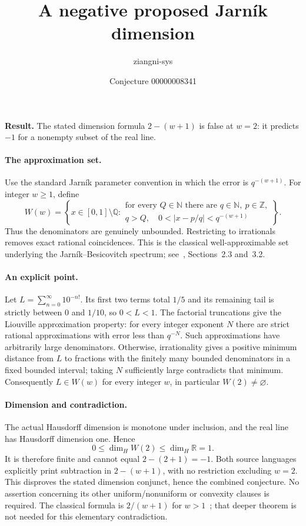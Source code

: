 \documentclass[11pt]{article}
\title{A negative proposed Jarn\'ik dimension}
\author{ziangni-sys}
\date{Conjecture 00000008341}
\begin{document}
\raggedright
\maketitle
\noindent\textbf{Result.} The stated dimension formula $2-(w+1)$ is false at $w=2$: it predicts $-1$ for a nonempty subset of the real line.

\paragraph{The approximation set.}
Use the standard Jarn\'ik parameter convention in which the error is $q^{-(w+1)}$. For integer $w\geq1$, define
\[
W(w)=\left\{x\in[0,1]\setminus\mathbb Q:
\begin{array}{l}
\text{for every }Q\in\mathbb N\text{ there are }q\in\mathbb N,\ p\in\mathbb Z,\\
q>Q,\quad 0<|x-p/q|<q^{-(w+1)}
\end{array}\right\}.
\]
Thus the denominators are genuinely unbounded. Restricting to irrationals removes exact rational coincidences. This is the classical well-approximable set underlying the Jarn\'ik--Besicovitch spectrum; see~\cite{BRV}, Sections~2.3 and~3.2.

\paragraph{An explicit point.}
Let $L=\sum_{n=0}^\infty10^{-n!}$. Its first two terms total $1/5$ and its remaining tail is strictly between $0$ and $1/10$, so $0<L<1$. The factorial truncations give the Liouville approximation property: for every integer exponent $N$ there are strict rational approximations with error less than $q^{-N}$. Such approximations have arbitrarily large denominators. Otherwise, irrationality gives a positive minimum distance from $L$ to fractions with the finitely many bounded denominators in a fixed bounded interval; taking $N$ sufficiently large contradicts that minimum. Consequently $L\in W(w)$ for every integer $w$, in particular $W(2)\ne\varnothing$.

\paragraph{Dimension and contradiction.}
The actual Hausdorff dimension is monotone under inclusion, and the real line has Hausdorff dimension one. Hence
\[
0\leq \dim_H W(2)\leq \dim_H\mathbb R=1.
\]
It is therefore finite and cannot equal $2-(2+1)=-1$. Both source languages explicitly print subtraction in $2-(w+1)$, with no restriction excluding $w=2$. This disproves the stated dimension conjunct, hence the combined conjecture. No assertion concerning its other uniform/nonuniform or convexity clauses is required. The classical formula is $2/(w+1)$ for $w>1$~\cite{BRV}; that deeper theorem is not needed for this elementary contradiction.
\end{document}
